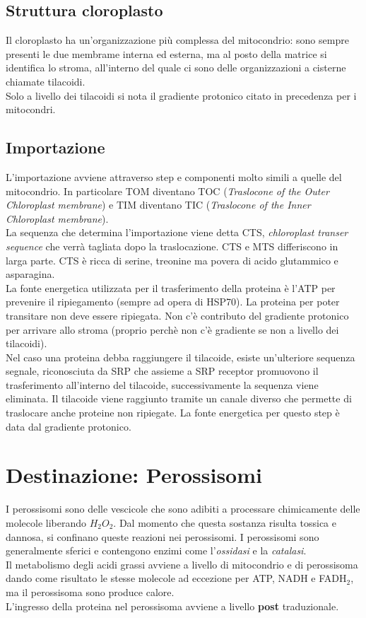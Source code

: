    \subsection{Struttura cloroplasto}
        Il cloroplasto ha un'organizzazione più complessa del mitocondrio: sono sempre presenti le due membrame interna ed esterna, ma al posto della matrice si identifica lo stroma, all'interno del quale ci sono delle organizzazioni a cisterne chiamate tilacoidi.\\
        Solo a livello dei tilacoidi si nota il gradiente protonico citato in precedenza per i mitocondri. 
        
    \subsection{Importazione}
        L'importazione avviene attraverso step e componenti molto simili a quelle del mitocondrio. In particolare TOM diventano TOC (\textit{Traslocone of the Outer Chloroplast membrane}) e TIM diventano TIC (\textit{Traslocone of the Inner Chloroplast membrane}). \\
        La sequenza che determina l'importazione viene detta CTS, \textit{chloroplast transer sequence} che verrà tagliata dopo la traslocazione. CTS e MTS differiscono in larga parte. CTS è ricca di serine, treonine ma povera di acido glutammico e asparagina.\\
        La fonte energetica utilizzata per il trasferimento della proteina è l'ATP per prevenire il ripiegamento (sempre ad opera di HSP70). La proteina per poter transitare non deve essere ripiegata. Non c'è contributo del gradiente protonico per arrivare allo stroma (proprio perchè non c'è gradiente se non a livello dei tilacoidi). \\
        Nel caso una proteina debba raggiungere il tilacoide, esiste un'ulteriore sequenza segnale, riconosciuta da SRP che assieme a SRP receptor promuovono il trasferimento all'interno del tilacoide, successivamente la sequenza viene eliminata.
        Il tilacoide viene raggiunto tramite un canale diverso che permette di traslocare anche proteine non ripiegate. La fonte energetica per questo step è data dal gradiente protonico.

\section{Destinazione: Perossisomi}
    I perossisomi sono delle vescicole che sono adibiti a processare chimicamente delle molecole liberando $H_{2}O_{2}$. Dal momento che questa sostanza risulta tossica e dannosa, si confinano queste reazioni nei perossisomi. 
    I perossisomi sono generalmente sferici e contengono enzimi come l'\textit{ossidasi} e la \textit{catalasi}.\\
    Il metabolismo degli acidi grassi avviene a livello di mitocondrio e di perossisoma dando come risultato le stesse molecole ad eccezione per ATP, NADH e FADH$_{2}$, ma il perossisoma sono produce calore.\\
    L'ingresso della proteina nel perossisoma avviene a livello \textbf{post} traduzionale.
    
